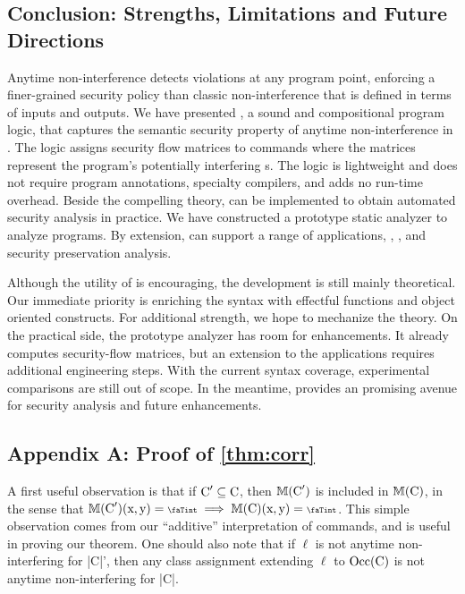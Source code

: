 \subsection{Conclusion: Strengths, Limitations and Future Directions}
\label{sec:conclusion}

Anytime non-interference detects violations at
any program point, enforcing a finer-grained security policy than classic non-interference that is
defined in terms of inputs and outputs. We have presented \lname, a sound and
compositional program logic, that captures the semantic security property of
anytime non-interference in . The logic assigns security flow matrices
to commands where the matrices represent the program's potentially interfering
s. The logic is lightweight and does not require program
annotations, specialty compilers, and adds no run-time overhead. Beside the
compelling theory, \lname can be implemented to obtain automated security
analysis in practice. We have constructed a prototype static analyzer \tool to
analyze \texttt{} programs. By extension, \tool can support a range of
applications, \eg {}, , and
security preservation analysis.

Although the utility of \lname is encouraging, the development is still mainly
theoretical. Our immediate priority is enriching the syntax with effectful
functions and object oriented constructs. For additional strength, we hope to
mechanize the theory. On the practical side, the prototype analyzer has room for
enhancements. It already computes security-flow matrices, but an extension to the applications requires additional engineering
steps. With the current syntax coverage, experimental comparisons are still out
of scope. In the meantime, \lname provides an promising avenue for security
analysis and future enhancements.

\clearpage

\subsection{Appendix A: Proof of \autoref{thm:corr}}\label{app:proof}

A first useful observation is that if \(\prc|C|' \subseteq
\prc|C|\), then \(\sfm{\prc|C|'}\) is included
in \(\sfm{\prc|C|}\), in the sense that \(\sfm{\prc|C|'}(\prc|x|,
\prc|y|) = \vi \implies \sfm{\prc|C|}(\prc|x|, \prc|y|) =
\vi\). This simple observation comes from our
\enquote{additive} interpretation of commands, and is useful in proving our
theorem. One should also note that if \(\ell\) is not anytime
non-interfering for \prc|C|', then any class assignment extending
\(\ell\) to \(\Occ(\prc|C|)\) is not anytime
non-interfering for \prc|C|.

